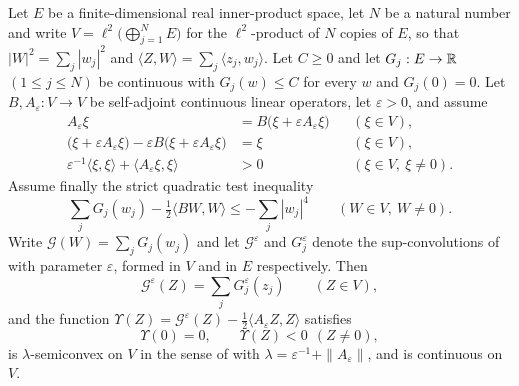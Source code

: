 \begin{lemma}
Let $E$ be a finite-dimensional real inner-product space, let $N$ be a natural
number and write $V=\ell^2\bigl(\bigoplus_{j=1}^NE\bigr)$ for the
$\ell^2$-product of $N$ copies of $E$, so that $|W|^2=\sum_j|w_j|^2$ and
$\langle Z,W\rangle=\sum_j\langle z_j,w_j\rangle$. Let $C\ge0$ and let
$G_j:E\to\mathbb{R}$ $(1\le j\le N)$ be continuous with $G_j(w)\le C$ for every $w$ and
$G_j(0)=0$. Let $B,A_\varepsilon:V\to V$ be self-adjoint continuous linear
operators, let $\varepsilon>0$, and assume
\begin{align}
  A_\varepsilon\xi&=B\bigl(\xi+\varepsilon A_\varepsilon\xi\bigr)
    &&(\xi\in V),\label{eq:srdt-res}\\
  \bigl(\xi+\varepsilon A_\varepsilon\xi\bigr)
    -\varepsilon B\bigl(\xi+\varepsilon A_\varepsilon\xi\bigr)&=\xi
    &&(\xi\in V),\label{eq:srdt-inv}\\
  \varepsilon^{-1}\langle\xi,\xi\rangle+\langle A_\varepsilon\xi,\xi\rangle&>0
    &&(\xi\in V,\ \xi\ne0).\label{eq:srdt-pos}
\end{align}
Assume finally the strict quadratic test inequality
\begin{equation}\label{eq:srdt-G3}
  \sum_jG_j(w_j)-\tfrac12\langle B W,W\rangle\le-\sum_j|w_j|^4
  \qquad(W\in V,\ W\ne0).
\end{equation}
Write $\mathcal G(W)=\sum_jG_j(w_j)$ and let $\mathcal G^\varepsilon$ and
$G_j^\varepsilon$ denote the sup-convolutions of  with
parameter $\varepsilon$, formed in $V$ and in $E$ respectively. Then
\begin{equation}\label{eq:srdt-sep}
  \mathcal G^\varepsilon(Z)=\sum_jG_j^\varepsilon(z_j)\qquad(Z\in V),
\end{equation}
and the function
$\Upsilon(Z)=\mathcal G^\varepsilon(Z)
-\tfrac12\langle A_\varepsilon Z,Z\rangle$ satisfies
\[
  \Upsilon(0)=0,\qquad\Upsilon(Z)<0\ \ (Z\ne0),
\]
is $\lambda$-semiconvex on $V$ in the sense of  with
$\lambda=\varepsilon^{-1}+\|A_\varepsilon\|$, and is continuous on $V$.
\end{lemma}
